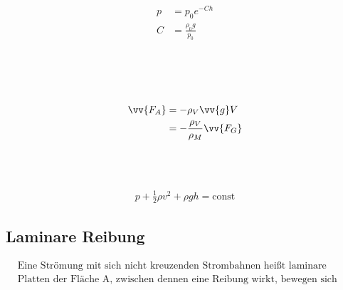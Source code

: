 \begin{boxleft}
\\
\\
\\
\end{boxleft}\begin{boxrightshaded}
\begin{align*}
p&=p_0 e^{-Ch}\\
C&=\frac{\rho_0 g}{p_0}
\end{align*}
\end{boxrightshaded}

\begin{boxleft}
\\
\\
\\
\end{boxleft}\begin{boxrightshaded}
\begin{align*}
\vv{F_A}&=-\rho_V \vv{g} V\\
&=-\frac{\rho_V}{\rho_M}\vv{F_G}
\end{align*}
\end{boxrightshaded}

\begin{boxleft}
\\
\\
\end{boxleft}\begin{boxrightshaded}
\begin{align*}
p+\frac{1}{2}\rho v^2+ \rho g h= \text{const}
\end{align*}
\end{boxrightshaded}

\subsection{Laminare Reibung}
\begin{boxshaded}
\begin{align*}
&\text{Eine Strömung mit sich nicht kreuzenden Strombahnen heißt laminare Strömung.}\\
&\text{Platten der Fläche A, zwischen dennen eine Reibung wirkt, bewegen sich relativ zueinander mit v und denn Abstand x.}
\end{align*}
\end{boxshaded}

